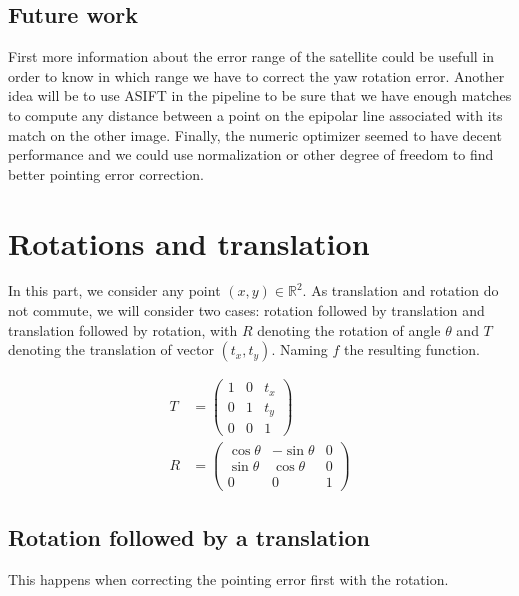 \documentclass[paper=a4, fontsize=11pt, onecolumn, tikz, dvipsnames, svgnames, x11names]{article}
\begin{document}
\subsection{Future work}
First more information about the error range of the satellite could be usefull in order to know in which range we have to correct the yaw rotation error. Another idea will be to use ASIFT in the pipeline to be sure that we have enough matches to compute any distance between a point on the epipolar line associated with its match on the other image. Finally, the numeric optimizer seemed to have decent performance and we could use normalization or other degree of freedom to find better pointing error correction.


\newpage

\appendix

\section{Rotations and translation}

In this part, we consider any point \((x, y) \in \mathbb{R}^2\). As translation and rotation do not commute, we will consider two cases: rotation followed by translation and translation followed by rotation, with \(R\) denoting the rotation of angle \(\theta\) and \(T\) denoting the translation of vector \((t_x, t_y)\). Naming \(f\) the resulting function.

\begin{align*}
    T &=
    \begin{pmatrix}
    1 & 0 & t_x \\
    0 & 1 & t_y \\
    0 & 0 & 1
    \end{pmatrix}
    \\
    R &=
    \begin{pmatrix}
    \cos \theta & -\sin \theta & 0 \\
    \sin \theta & \cos \theta & 0 \\
    0 & 0 & 1
    \end{pmatrix}
\end{align*}


\subsection{Rotation followed by a translation}
This happens when correcting the pointing error first with the rotation.
\end{document}
